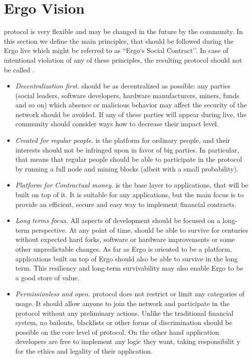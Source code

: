 \section{Ergo Vision}
\label{sec:social}


\Ergo{} protocol is very flexible and may be changed in the future by the community.
In this section we define the main principles, that should be followed during the Ergo live which
might be referred to as ``Ergo`s Social Contract''.
In case of intentional violation of any of these principles, the resulting protocol should not
be called \Ergo{}.


\begin{itemize}
    \item{\em Decentralization first.} \Ergo{} should be as decentralized as possible: any parties (social leaders, software developers, hardware manufacturers, miners, funds and so on)
    which absence or malicious behavior may affect the security of the network should be avoided.
    If any of these parties will appear during \Ergo{} live, the community should consider ways how to decrease their impact level.
    \item{\em Created for regular people.} \Ergo{} is the platform for ordinary people, and their interests should not be infringed upon in favor of big parties.
    In particular, that means that regular people should be able to participate in the protocol by running a full node and mining blocks (albeit with a small probability).
    \item{\em Platform for Contractual money.} \Ergo{} is the base layer to applications, that will be built on top of it.
    It is suitable for any applications, but the main focus is to provide an efficient, secure and easy way to implement financial contracts.
    \item{\em Long terms focus.} All aspects of \Ergo{} development should be focused on a long-term perspective.
    At any point of time, \Ergo{} should be able to survive for centuries without expected hard forks,
    software or hardware improvements or some other unpredictable changes.
    As far as Ergo is oriented to be a platform, applications built on top of Ergo should also be able to survive in the long term.
    This resiliency and long-term survivability may also enable Ergo to be a good store of value.
    \item{\em Permissionless and open.} \Ergo{} protocol does not restrict or limit any categories of usage.
    It should allow anyone to join the network and participate in the protocol without any preliminary actions.
    Unlike the traditional financial system, no bailouts, blacklists or other forms of discrimination should be possible
    on the core level of \Ergo{} protocol.
    On the other hand application developers are free to implement any logic they want, taking responsibilit
    y for the ethics and legality of their application.
\end{itemize}